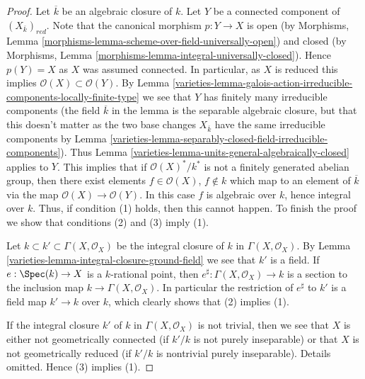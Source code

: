 \begin{proof}

Let $\overline{k}$ be an algebraic closure of $k$.
Let $Y$ be a connected component of $(X_{\overline{k}})_{red}$.
Note that the canonical morphism $p : Y \to X$ is open (by
Morphisms, Lemma \ref{morphisms-lemma-scheme-over-field-universally-open})
and closed (by
Morphisms, Lemma \ref{morphisms-lemma-integral-universally-closed}).
Hence $p(Y) = X$ as $X$ was assumed connected. In particular, as
$X$ is reduced this implies $\mathcal{O}(X) \subset \mathcal{O}(Y)$. By
Lemma \ref{varieties-lemma-galois-action-irreducible-components-locally-finite-type}
we see that $Y$ has finitely many irreducible components (the field
$\overline{k}$ in the lemma is the separable algebraic closure, but
that this doesn't matter as the two base changes $X_{\overline{k}}$
have the same irreducible components by
Lemma \ref{varieties-lemma-separably-closed-field-irreducible-components}). Thus
Lemma \ref{varieties-lemma-units-general-algebraically-closed}
applies to $Y$. This implies that if $\mathcal{O}(X)^*/k^*$ is
not a finitely generated abelian group, then there exist elements
$f \in \mathcal{O}(X)$, $f \not \in k$ which map to an element of
$\overline{k}$ via the map $\mathcal{O}(X) \to \mathcal{O}(Y)$.
In this case $f$ is algebraic over $k$, hence
integral over $k$. Thus, if condition (1) holds, then this cannot happen.
To finish the proof we show that conditions (2) and (3) imply (1).

\medskip\noindent
Let $k \subset k' \subset \Gamma(X, \mathcal{O}_X)$ be the integral
closure of $k$ in $\Gamma(X, \mathcal{O}_X)$. By
Lemma \ref{varieties-lemma-integral-closure-ground-field}
we see that $k'$ is a field.
If $e : \Spec(k) \to X$ is a $k$-rational point, then
$e^\sharp : \Gamma(X, \mathcal{O}_X) \to k$ is a section to the
inclusion map $k \to \Gamma(X, \mathcal{O}_X)$. In particular the
restriction of $e^\sharp$ to $k'$ is a field map $k' \to k$ over $k$,
which clearly shows that (2) implies (1).

\medskip\noindent
If the integral closure $k'$ of $k$ in $\Gamma(X, \mathcal{O}_X)$
is not trivial, then we see that $X$ is either not geometrically connected
(if $k'/k$ is not purely inseparable) or that $X$ is not
geometrically reduced (if $k'/k$ is nontrivial purely inseparable).
Details omitted. Hence (3) implies (1).
\end{proof}


